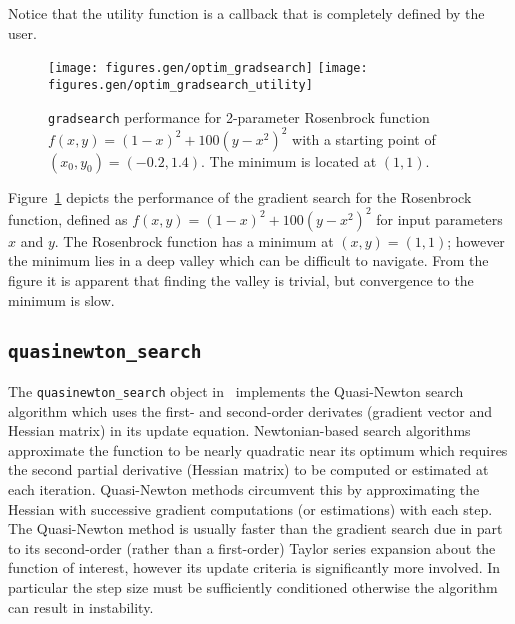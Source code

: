 
%
Notice that the utility function is a callback that is completely
defined by the user.
%
\begin{figure}
\centering
  \texttt{[image: figures.gen/optim\_gradsearch]}
  \texttt{[image: figures.gen/optim\_gradsearch\_utility]}
\caption{
    {\tt gradsearch} performance for 2-parameter Rosenbrock function
    $f(x,y) = (1-x)^2 + 100(y-x^2)^2$
    with a starting point of $(x_0,y_0)=(-0.2,1.4)$.
    The minimum is located at $(1,1)$.}
\label{fig:module:optim:gradsearch}
\end{figure}
%
Figure~\ref{fig:module:optim:gradsearch} depicts the performance of the
gradient search for the Rosenbrock function, defined as
$f(x,y) = (1-x)^2 + 100(y-x^2)^2$ for input parameters $x$ and $y$.
The Rosenbrock function has a minimum at $(x,y)=(1,1)$;
however the minimum lies in a deep valley which can be difficult to
navigate.
From the figure it is apparent that finding the valley is trivial,
but convergence to the minimum is slow.


\subsection{{\tt quasinewton\_search} }
\label{module:optim:quasinewton_search}
The {\tt quasinewton\_search} object in \liquid\ implements the
Quasi-Newton search algorithm which uses the first- and second-order
derivates (gradient vector and Hessian matrix) in its update equation.
Newtonian-based search algorithms approximate the function to be nearly
quadratic near its optimum which requires the second partial derivative
(Hessian matrix) to be computed or estimated at each iteration.
Quasi-Newton methods circumvent this by approximating the Hessian with
successive gradient computations (or estimations) with each step.
The Quasi-Newton method is usually faster than the gradient search due
in part to its second-order (rather than a first-order) Taylor series
expansion about the function of interest,
however its update criteria is significantly more involved.
In particular the step size %
must be sufficiently conditioned
otherwise the algorithm can result in instability.


